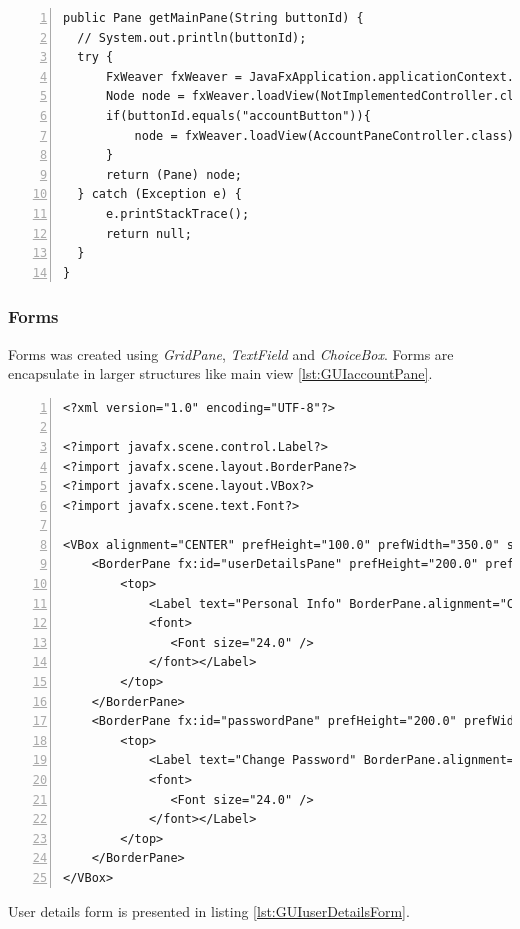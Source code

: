 \begin{lstlisting}[breaklines=true, numbers=left, stepnumber=1, label={lst:GUISwitchingContextLoadingContext}, caption={Switching context of main view - loading new view}]
public Pane getMainPane(String buttonId) {
  // System.out.println(buttonId);
  try {
      FxWeaver fxWeaver = JavaFxApplication.applicationContext.getBean(FxWeaver.class);
      Node node = fxWeaver.loadView(NotImplementedController.class);
      if(buttonId.equals("accountButton")){
          node = fxWeaver.loadView(AccountPaneController.class);
      } 
      return (Pane) node;
  } catch (Exception e) {
      e.printStackTrace();
      return null;
  }
}
\end{lstlisting}


\subsubsection{Forms}
Forms was created using \textit{GridPane}, \textit{TextField} and \textit{ChoiceBox}. Forms are encapsulate in larger structures like main view \ref{lst:GUIaccountPane}.

\begin{lstlisting}[breaklines=true, numbers=left, stepnumber=1, label={lst:GUIaccountPane}, caption={Encapsulation of userDetailsPane in main view Pane}]
<?xml version="1.0" encoding="UTF-8"?>

<?import javafx.scene.control.Label?>
<?import javafx.scene.layout.BorderPane?>
<?import javafx.scene.layout.VBox?>
<?import javafx.scene.text.Font?>

<VBox alignment="CENTER" prefHeight="100.0" prefWidth="350.0" spacing="10" xmlns="http://javafx.com/javafx/8.0.171" xmlns:fx="http://javafx.com/fxml/1" fx:controller="io.swagger.app.controller.AccountPaneController">
    <BorderPane fx:id="userDetailsPane" prefHeight="200.0" prefWidth="200.0">
        <top>
            <Label text="Personal Info" BorderPane.alignment="CENTER">
            <font>
               <Font size="24.0" />
            </font></Label>
        </top>
    </BorderPane>
    <BorderPane fx:id="passwordPane" prefHeight="200.0" prefWidth="200.0">
        <top>
            <Label text="Change Password" BorderPane.alignment="CENTER">
            <font>
               <Font size="24.0" />
            </font></Label>
        </top>
    </BorderPane>
</VBox>
\end{lstlisting}

User details form is presented in listing \ref{lst:GUIuserDetailsForm}.

